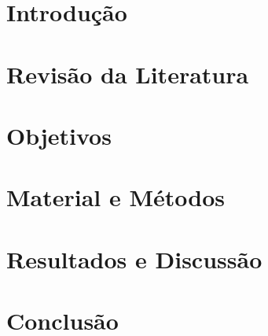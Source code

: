 \documentclass[
	12pt,				%
	openany,			%
	twoside,			%
	a4paper,			%
	chapter=TITLE,		%
	english,			%
	brazil				%
	]{abntex2}
\begin{document}
\chapter{Introdução}
\lipsum[1-7]




%

\chapter{Revisão da Literatura}\label{cap_trabalho_academico}



\chapter{Objetivos}

\chapter{Material e Métodos}

\chapter{Resultados e Discussão}


\chapter{Conclusão}


\postextual
\end{document}
